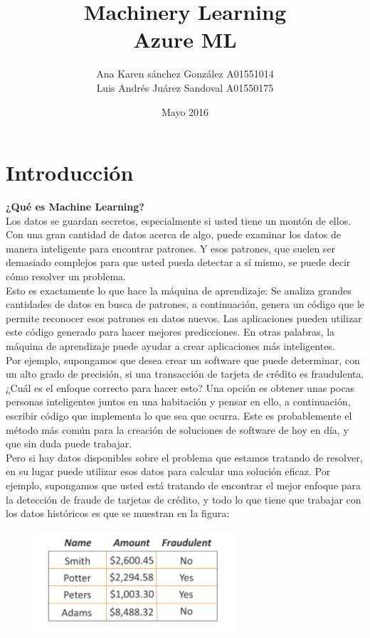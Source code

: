 \documentclass[11pt]{article}
\title{\textbf{Machinery Learning  \\ Azure ML}}
\author{
Ana Karen sánchez González A01551014 \\ 
Luis Andrés Juárez Sandoval A01550175}
\date{Mayo 2016}
\begin{document}
\maketitle
\newpage

\section{Introducción}


\textbf{¿Qué es Machine Learning? }\\

Los datos se guardan secretos, especialmente si usted tiene un montón de ellos. Con una gran cantidad de datos acerca de algo, puede examinar los datos de manera inteligente para encontrar patrones. Y esos patrones, que suelen ser demasiado complejos para que usted pueda detectar a sí mismo, se puede decir cómo resolver un problema.\\

Esto es exactamente lo que hace la máquina de aprendizaje: Se analiza grandes cantidades de datos en busca de patrones, a continuación, genera un código que le permite reconocer esos patrones en datos nuevos. Las aplicaciones pueden utilizar este código generado para hacer mejores predicciones. En otras palabras, la máquina de aprendizaje puede ayudar a crear aplicaciones más inteligentes.\\

Por ejemplo, supongamos que desea crear un software que puede determinar, con un alto grado de precisión, si una transacción de tarjeta de crédito es fraudulenta. ¿Cuál es el enfoque correcto para hacer esto? Una opción es obtener unas pocas personas inteligentes juntos en una habitación y pensar en ello, a continuación, escribir código que implementa lo que sea que ocurra. Este es probablemente el método más común para la creación de soluciones de software de hoy en día, y que sin duda puede trabajar.\\

Pero si hay datos disponibles sobre el problema que estamos tratando de resolver, en su lugar puede utilizar esos datos para calcular una solución eficaz. Por ejemplo, supongamos que usted está tratando de encontrar el mejor enfoque para la detección de fraude de tarjetas de crédito, y todo lo que tiene que trabajar con los datos históricos es que se muestran en la figura:\\

\begin{figure}[htp]
\centering
\includegraphics[width=7.5cm]{a.jpg}
\label{fig:lion}
\end{figure}
\end{document}
